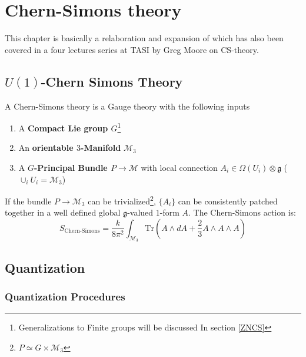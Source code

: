 \documentclass[11pt]{article}
\theoremstyle{definition}
\numberwithin{equation}{section}
\begin{document}
\section{Chern-Simons theory}
This chapter is basically a relaboration and expansion of \cite[Chapter 2]{Moor} which has also been covered in a four lectures series at TASI by Greg Moore on CS-theory. 

\subsection{$U(1)$-Chern Simons Theory}
A Chern-Simons theory is a Gauge theory with the following inputs
\begin{enumerate}
    \item A \textbf{Compact Lie group $G$}\footnote{Generalizations to Finite groups will be discussed In section \ref{ZNCS}}
    \item An \textbf{orientable $3$-Manifold} $\mathcal{M}_3$
    \item A \textbf{$G$-Principal Bundle $P \to \mathcal{M}$} with local connection $A_i \in \Omega(U_i) \otimes \mathfrak{g}$ ($\cup_{i} U_i = \mathcal{M}_3$)
\end{enumerate}
If the bundle $P \to \mathcal{M}_3$ can be trivialized\footnote{$P \simeq G \times \mathcal{M}_3$}, $\{A_i\}$ can be consistently patched together in a well defined global $\mathfrak{g}$-valued $1$-form $A$. The Chern-Simons action is:
\begin{equation}
    S_{\text{Chern-Simons}} = \frac{k}{8 \pi^2} \int_{\mathcal{M}_3} \text{Tr}(A \wedge d A + \frac{2}{3} A \wedge A \wedge A)
\end{equation}

\subsection{Quantization}
\subsubsection{Quantization Procedures}
\end{document}
